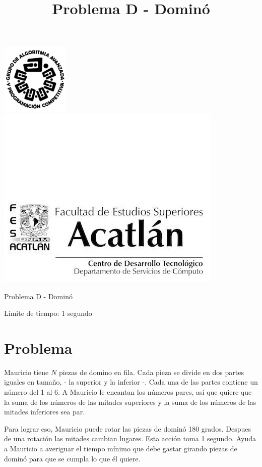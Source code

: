 \documentclass[letter,10pt]{article}
\date{}
\begin{document}
\title{Problema D - Dominó}

\includegraphics[scale=0.6]{logo} \hspace*{9.00cm}
\includegraphics[scale=0.5]{dsc} 
\bigskip
\begin{center}
    \Large Problema D - Dominó
\end{center}

\begin{flushright}
Límite de tiempo: 1 segundo
\par\end{flushright}
\bigskip

\section*{Problema}

Mauricio tiene $N$ piezas de domino en fila. Cada pieza se divide en dos partes iguales en tamaño, - la superior y la inferior -. Cada una de las partes contiene un número del 1 al 6.
A Mauricio le encantan los números pares, así que quiere que la suma de los números de las mitades superiores y la suma de los números de las mitades inferiores sea par.

Para lograr eso, Mauricio puede rotar las piezas de dominó 180 grados. Despues de una rotación las mitades cambian lugares. Esta acción toma 1 segundo. Ayuda a Mauricio a averiguar el tiempo mínimo que debe gastar girando piezas de dominó para que se cumpla lo que él quiere.
\end{document}
